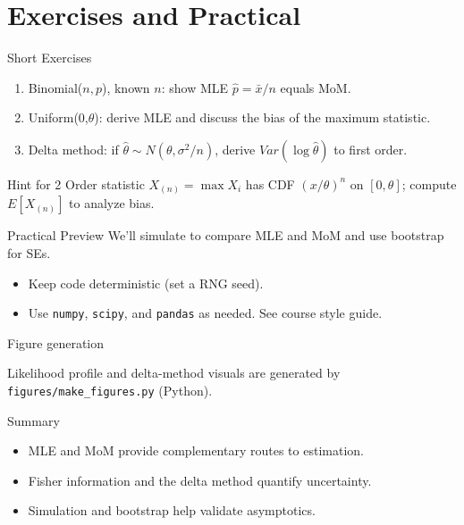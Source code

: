 \documentclass{beamer}
\def\E{E}%
\def\Var{Var}%
\def\mathbb#1{#1}%
\def\mathcal#1{#1}%
\newcommand{\E}{\mathbb{E}}
\newcommand{\Var}{\operatorname{Var}}
\newcommand{\1}{\mathbf{1}}
\begin{document}
\section{Exercises and Practical}

\begin{frame}{Short Exercises}
  \small
  \begin{enumerate}
    \item Binomial(\(n,p\)), known \(n\): show MLE \(\hat p=\bar x/n\) equals MoM.
    \item Uniform(0,\(\theta\)): derive MLE and discuss the bias of the maximum statistic.
    \item Delta method: if \(\hat\theta\sim \mathcal N(\theta,\sigma^2/n)\), derive \(\Var(\log \hat\theta)\) to first order.
  \end{enumerate}
  \begin{alertblock}{Hint for 2}
    \small Order statistic \(X_{(n)}=\max X_i\) has CDF \((x/\theta)^n\) on \([0,\theta]\); compute \(\E[X_{(n)}]\) to analyze bias.
  \end{alertblock}
\end{frame}

\begin{frame}{Practical Preview}
  We'll simulate to compare MLE and MoM and use bootstrap for SEs.
  \begin{itemize}
    \item Keep code deterministic (set a RNG seed).
    \item Use \texttt{numpy}, \texttt{scipy}, and \texttt{pandas} as needed. See course style guide.
  \end{itemize}
  \begin{exampleblock}{Figure generation}
    \small\raggedright Likelihood profile and delta-method visuals are generated by \texttt{figures/make\_figures.py} (Python).
  \end{exampleblock}
\end{frame}

\begin{frame}{Summary}
  \begin{itemize}
    \item MLE and MoM provide complementary routes to estimation.
    \item Fisher information and the delta method quantify uncertainty.
    \item Simulation and bootstrap help validate asymptotics.
  \end{itemize}
\end{frame}
\end{document}
